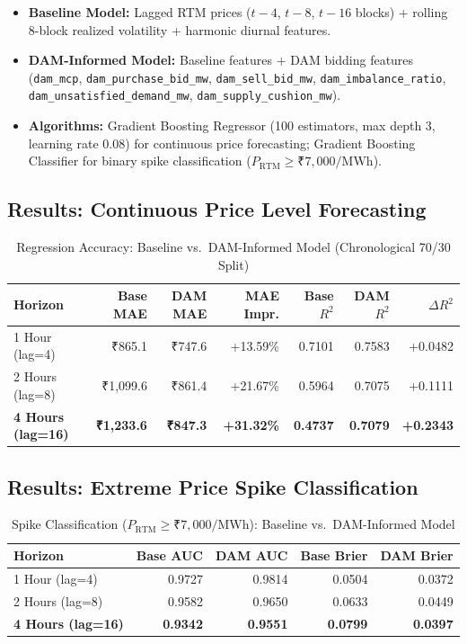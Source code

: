\documentclass[12pt, a4paper]{article}
\theoremstyle{definition}
\newcommand{\MWh}{\text{MWh}}
\newcommand{\rtm}{\text{RTM}}
\begin{document}
\begin{itemize}
    \item \textbf{Baseline Model:} Lagged RTM prices ($t-4$, $t-8$, $t-16$ blocks) + rolling 8-block realized volatility + harmonic diurnal features.
    \item \textbf{DAM-Informed Model:} Baseline features $+$ DAM bidding features (\texttt{dam\_mcp}, \texttt{dam\_purchase\_bid\_mw}, \texttt{dam\_sell\_bid\_mw}, \texttt{dam\_imbalance\_ratio}, \texttt{dam\_unsatisfied\_demand\_mw}, \texttt{dam\_supply\_cushion\_mw}).
    \item \textbf{Algorithms:} Gradient Boosting Regressor (100 estimators, max depth 3, learning rate 0.08) for continuous price forecasting; Gradient Boosting Classifier for binary spike classification ($P_{\rtm} \geq \text{₹}7{,}000/\MWh$).
\end{itemize}

\subsection{Results: Continuous Price Level Forecasting}

\begin{table}[H]
\centering
\caption{Regression Accuracy: Baseline vs.\ DAM-Informed Model (Chronological 70/30 Split)}
\label{tab:regression}
\begin{tabular}{l r r r r r r}
\toprule
\textbf{Horizon} & \textbf{Base MAE} & \textbf{DAM MAE} & \textbf{MAE Impr.} & \textbf{Base $R^2$} & \textbf{DAM $R^2$} & \textbf{$\Delta R^2$} \\
\midrule
1 Hour (lag=4) & ₹865.1 & ₹747.6 & +13.59\% & 0.7101 & 0.7583 & +0.0482 \\
2 Hours (lag=8) & ₹1,099.6 & ₹861.4 & +21.67\% & 0.5964 & 0.7075 & +0.1111 \\
\textbf{4 Hours (lag=16)} & \textbf{₹1,233.6} & \textbf{₹847.3} & \textbf{+31.32\%} & \textbf{0.4737} & \textbf{0.7079} & \textbf{+0.2343} \\
\bottomrule
\end{tabular}
\end{table}

\subsection{Results: Extreme Price Spike Classification}

\begin{table}[H]
\centering
\caption{Spike Classification ($P_{\rtm} \geq \text{₹}7{,}000/\MWh$): Baseline vs.\ DAM-Informed Model}
\label{tab:classification}
\begin{tabular}{l r r r r}
\toprule
\textbf{Horizon} & \textbf{Base AUC} & \textbf{DAM AUC} & \textbf{Base Brier} & \textbf{DAM Brier} \\
\midrule
1 Hour (lag=4) & 0.9727 & 0.9814 & 0.0504 & 0.0372 \\
2 Hours (lag=8) & 0.9582 & 0.9650 & 0.0633 & 0.0449 \\
\textbf{4 Hours (lag=16)} & \textbf{0.9342} & \textbf{0.9551} & \textbf{0.0799} & \textbf{0.0397} \\
\bottomrule
\end{tabular}
\end{table}
\end{document}
